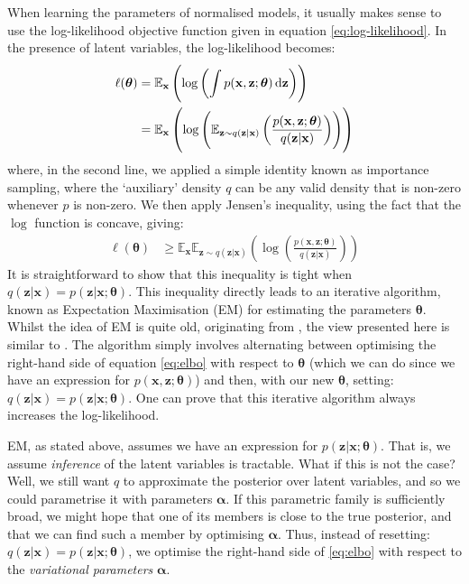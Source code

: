 \documentclass[11pt, oneside]{article}
\newcommand{\thetab}{{\boldsymbol{\theta}}}
\newcommand{\alphab}{{\boldsymbol{\alpha}}}
\newcommand{\pnorm}{p}
\newcommand{\q}[1]{q(\z|{#1})}
\newcommand{\x}{{\mathbf x}}
\newcommand{\z}{{\mathbf z}}
\newcommand{\E}{\mathbb{E}}
\newcommand{\Ex}{\E_{\x}}
\newcommand{\Evar}[1]{\E_{\z \sim \q{#1}}}
\begin{document}
When learning the parameters of normalised models, it usually makes sense to use the log-likelihood objective function given in equation \ref{eq:log-likelihood}. In the presence of latent variables, the log-likelihood becomes:
\begin{align}
    \ell(\thetab) &= \Ex \left( \log \left( \int \pnorm(\x, \z;\thetab) \dif \z  \right) \right) \\
                  &= \Ex \left( \log \left( \Evar{\x} \left( \frac{\pnorm(\x, \z;\thetab)}{\q{\x}} \right)  \right) \right)
\end{align}
where, in the second line, we applied a simple identity known as importance sampling, where the `auxiliary' density $q$ can be any valid density that is non-zero whenever $\pnorm$ is non-zero. We then apply Jensen's inequality, using the fact that the $\log$ function is concave, giving:
\begin{align}
    \ell(\thetab) &\geq \Ex \Evar{\x} \left( \log \left( \frac{\pnorm(\x, \z;\thetab)}{\q{\x}} \right) \right)
    \label{eq:elbo}
\end{align}
It is straightforward to show that this inequality is tight when $\q{\x} = \pnorm(\z | \x; \thetab)$. This inequality directly leads to an iterative algorithm, known as Expectation Maximisation (EM) for estimating the parameters $\thetab$. Whilst the idea of EM is quite old, originating from \citep{dempster1977maximum}, the view presented here is similar to \citep{neal1998view}. The algorithm simply involves alternating between optimising the right-hand side of equation \ref{eq:elbo} with respect to $\thetab$ (which we can do since we have an expression for $\pnorm(\x, \z;\thetab)$) and then, with our new $\thetab$, setting: $\q{\x} = \pnorm(\z | \x; \thetab)$. One can prove that this iterative algorithm always increases the log-likelihood.

EM, as stated above, assumes we have an expression for $\pnorm(\z | \x; \thetab)$. That is, we assume \emph{inference} of the latent variables is tractable. What if this is not the case? Well, we still want $q$ to approximate the posterior over latent variables, and so we could parametrise it with parameters $\alphab$. If this parametric family is sufficiently broad, we might hope that one of its members is close to the true posterior, and that we can find such a member by optimising $\alphab$. Thus, instead of resetting: $\q{\x} = \pnorm(\z | \x; \thetab)$, we optimise the right-hand side of \ref{eq:elbo} with respect to the \emph{variational parameters} $\alphab$.
\end{document}
